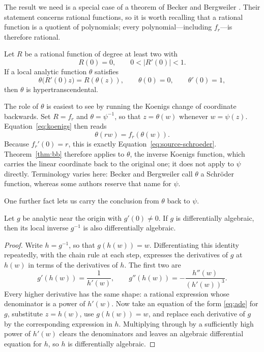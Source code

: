 The result we need is a special case of a theorem of Becker and Bergweiler \cite{BeckerBergweiler1995}. Their statement concerns rational functions, so it is worth recalling that a rational function is a quotient of polynomials; every polynomial---including $f_r$---is therefore rational.

\begin{theorem}\label{thm:bb}
Let $R$ be a rational function of degree at least two with
\[
 R(0)=0,
 \qquad
 0<|R'(0)|<1.
\]
If a local analytic function $\theta$ satisfies
\begin{equation}\label{eq:source-schroeder}
 \theta\bigl(R'(0)z\bigr)=R(\theta(z)),
 \qquad
 \theta(0)=0,
 \qquad
 \theta'(0)=1,
\end{equation}
then $\theta$ is hypertranscendental.
\end{theorem}


The role of $\theta$ is easiest to see by running the Koenigs change of coordinate backwards. Set $R=f_r$ and $\theta=\psi^{-1}$, so that $z=\theta(w)$ whenever $w=\psi(z)$. Equation~\eqref{eq:koenigs} then reads
\[
 \theta(rw)=f_r(\theta(w)).
\]
Because $f_r'(0)=r$, this is exactly Equation~\eqref{eq:source-schroeder}. Theorem~\ref{thm:bb} therefore applies to $\theta$, the inverse Koenigs function, which carries the linear coordinate back to the original one; it does not apply to $\psi$ directly. Terminology varies here: Becker and Bergweiler call $\theta$ a Schr\"oder function, whereas some authors reserve that name for $\psi$.

One further fact lets us carry the conclusion from $\theta$ back to $\psi$.

\begin{lemma}\label{lem:inverse}
Let $g$ be analytic near the origin with $g'(0)\neq0$. If $g$ is differentially algebraic, then its local inverse $g^{-1}$ is also differentially algebraic.
\end{lemma}

\begin{proof}
Write $h=g^{-1}$, so that $g(h(w))=w$. Differentiating this identity repeatedly, with the chain rule at each step, expresses the derivatives of $g$ at $h(w)$ in terms of the derivatives of $h$. The first two are
\[
 g'(h(w))=\frac{1}{h'(w)},
 \qquad
 g''(h(w))=-\frac{h''(w)}{(h'(w))^3}.
\]
Every higher derivative has the same shape: a rational expression whose denominator is a power of $h'(w)$. Now take an equation of the form \eqref{eq:ade} for $g$, substitute $z=h(w)$, use $g(h(w))=w$, and replace each derivative of $g$ by the corresponding expression in $h$. Multiplying through by a sufficiently high power of $h'(w)$ clears the denominators and leaves an algebraic differential equation for $h$, so $h$ is differentially algebraic.
\end{proof}

